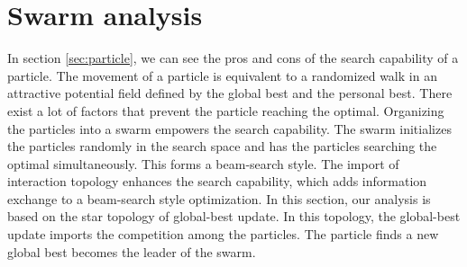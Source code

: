 \section{Swarm analysis}
\label{sec:swarm}




In section \ref{sec:particle}, we can see the pros and cons of the search capability of a particle.
The movement of a particle is equivalent to a randomized walk in an attractive potential field defined by the global best and the personal best.
There exist a lot of factors that prevent the particle reaching the optimal.
Organizing the particles into a swarm empowers the search capability.
The swarm initializes the particles randomly in the search space and has the particles searching the optimal simultaneously.
This forms a beam-search style.
The import of interaction topology enhances the search capability, which adds information exchange to a beam-search style optimization.
In this section, our analysis is based on the star topology of global-best update.
In this topology, the global-best update imports the competition among the particles.
The particle finds a new global best becomes the leader of the swarm.


